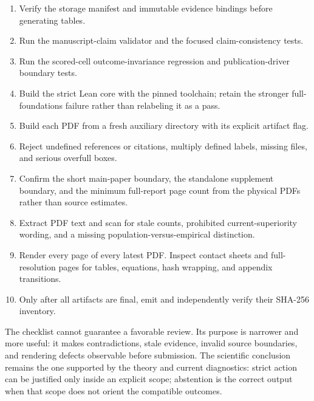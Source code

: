 \begin{enumerate}[leftmargin=*]
\item Verify the storage manifest and immutable evidence bindings before generating tables.
\item Run the manuscript-claim validator and the focused claim-consistency tests.
\item Run the scored-cell outcome-invariance regression and publication-driver boundary tests.
\item Build the strict Lean core with the pinned toolchain; retain the stronger
full-foundations failure rather than relabeling it as a pass.
\item Build each PDF from a fresh auxiliary directory with its explicit artifact flag.
\item Reject undefined references or citations, multiply defined labels, missing files, and serious
overfull boxes.
\item Confirm the short main-paper boundary, the standalone supplement boundary, and the minimum
full-report page count from the physical PDFs rather than source estimates.
\item Extract PDF text and scan for stale counts, prohibited current-superiority wording, and a
missing population-versus-empirical distinction.
\item Render every page of every latest PDF.  Inspect contact sheets and full-resolution pages for
tables, equations, hash wrapping, and appendix transitions.
\item Only after all artifacts are final, emit and independently verify their SHA-256 inventory.
\end{enumerate}

The checklist cannot guarantee a favorable review.  Its purpose is narrower and more useful: it
makes contradictions, stale evidence, invalid source boundaries, and rendering defects observable
before submission.  The scientific conclusion remains the one supported by the theory and current
diagnostics: strict action can be justified only inside an explicit scope; abstention is the
correct output when that scope does not orient the compatible outcomes.

